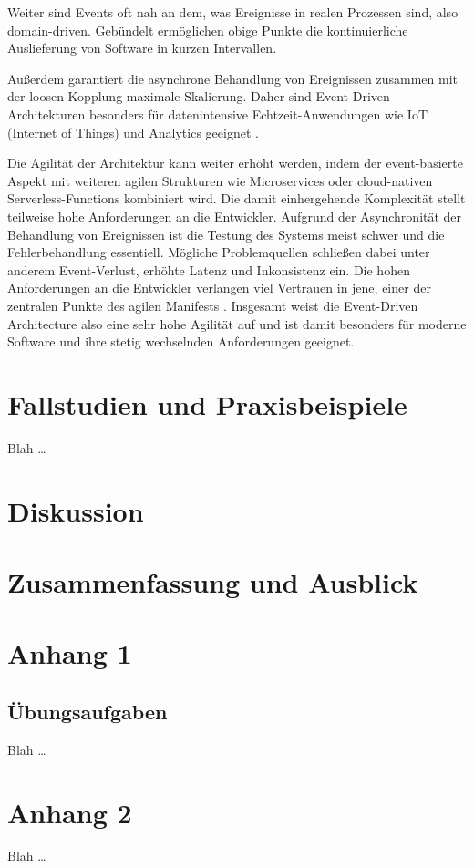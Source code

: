\documentclass[acmtog]{acmart}
\begin{document}
    Weiter sind Events oft nah an dem, was Ereignisse in realen Prozessen sind, also domain-driven.
    Gebündelt ermöglichen obige Punkte die kontinuierliche Auslieferung von Software in kurzen Intervallen.

    Außerdem garantiert die asynchrone Behandlung von Ereignissen zusammen mit der loosen Kopplung maximale Skalierung.
    Daher sind Event-Driven Architekturen besonders für datenintensive Echtzeit-Anwendungen wie IoT (Internet of Things) und Analytics geeignet \cite{iotEda}.

    Die Agilität der Architektur kann weiter erhöht werden, indem der event-basierte Aspekt mit weiteren agilen Strukturen wie Microservices oder cloud-nativen Serverless-Functions kombiniert wird.
    Die damit einhergehende Komplexität stellt teilweise hohe Anforderungen an die Entwickler.
    Aufgrund der Asynchronität der Behandlung von Ereignissen ist die Testung des Systems meist schwer und die Fehlerbehandlung essentiell.
    Mögliche Problemquellen schließen dabei unter anderem Event-Verlust, erhöhte Latenz und Inkonsistenz ein.
    Die hohen Anforderungen an die Entwickler verlangen viel Vertrauen in jene, einer der zentralen Punkte des agilen Manifests \cite{agileManifesto}.
    Insgesamt weist die Event-Driven Architecture also eine sehr hohe Agilität auf und ist damit besonders für moderne Software und ihre stetig wechselnden Anforderungen geeignet.



    \section{Fallstudien und Praxisbeispiele}
    Blah \ldots


    \section{Diskussion}


    \section{Zusammenfassung und Ausblick}






    
    

    \appendix


    \section{Anhang 1}

    \subsection{Übungsaufgaben}
    Blah \ldots


    \section{Anhang 2}
    Blah \ldots
\end{document}
